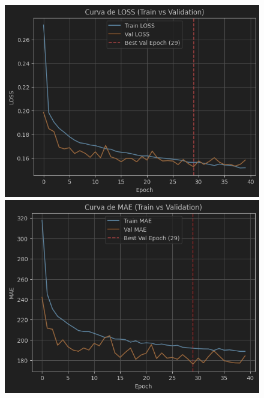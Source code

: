 \begin{figure}[H]
	\centering
	\begin{minipage}{0.48\textwidth}
		\centering
		\includegraphics[width=\linewidth]{includes/cap5/graphs/sid5_trafficformer_loss.png}
		\vspace{0.2cm}
		\includegraphics[width=\linewidth]{includes/cap5/graphs/sid5_trafficformer_mae.png}
		\vspace{0.2cm}

\end{minipage}
\end{figure}
